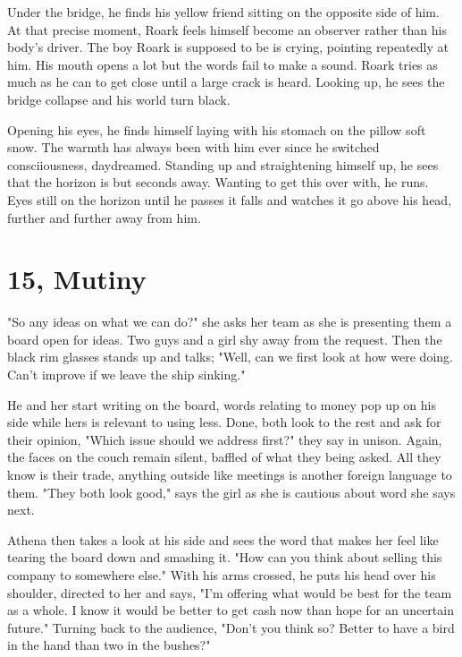         Under the bridge, he finds his yellow friend sitting on the opposite side of him. At that precise moment, Roark feels himself become
    an observer rather than his body's driver. The boy Roark is supposed to be is crying, pointing repeatedly at him. His mouth opens a lot
    but the words fail to make a sound. Roark tries as much as he can to get close until a large crack is heard. Looking up, he sees the bridge
    collapse and his world turn black.

        Opening his eyes, he finds himself laying with his stomach on the pillow soft snow. The warmth has always been with him ever since he
    switched consciiousness, daydreamed. Standing up and straightening himself up, he sees that the horizon is but seconds away. Wanting to get
    this over with, he runs. Eyes still on the horizon until he passes it falls and watches it go above his head, further and further away
    from him.

\section{15, Mutiny}

        "So any ideas on what we can do?" she asks her team as she is presenting them a board open for ideas. Two guys and a girl shy away from
    the request. Then the black rim glasses stands up and talks; "Well, can we first look at how were doing. Can't improve if we leave the ship
    sinking."

        He and her start writing on the board, words relating to money pop up on his side while hers is relevant to using less. Done, both look
    to the rest and ask for their opinion, "Which issue should we address first?" they say in unison. Again, the faces on the couch remain silent,
    baffled of what they being asked. All they know is their trade, anything outside like meetings is another foreign language to them. "They
    both look good," says the girl as she is cautious about word she says next.

        Athena then takes a look at his side and sees the word that makes her feel like tearing the board down and smashing it. "How can you
    think about selling this company to somewhere else." With his arms crossed, he puts his head over his shoulder, directed to her and says,
    "I'm offering what would be best for the team as a whole. I know it would be better to get cash now than hope for an uncertain future." 
    Turning back to the audience, "Don't you think so? Better to have a bird in the hand than two in the bushes?"

